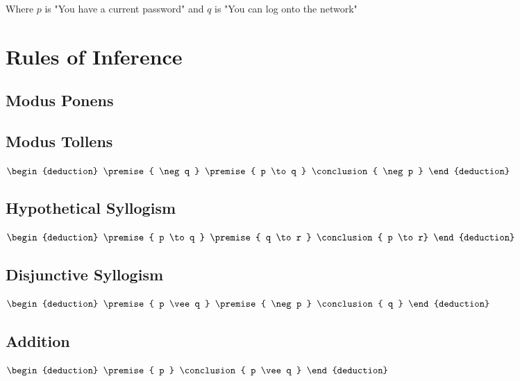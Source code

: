 \documentclass[12pt letter]{report}
\begin{document}
Where $p$ is "You have a current password" and $q$ is "You can log onto the network"



\section{Rules of Inference}

\subsection{Modus Ponens}

\begin{deduction}
\end{deduction}

\subsection{Modus Tollens}

\begin{math}
	\begin{deduction}
		\premise{ \neg q }
		\premise{ p \to q }
		\conclusion{ \neg p }
	\end{deduction}
\end{math}


\subsection{Hypothetical Syllogism}

\begin{math}
	\begin{deduction}
		\premise{ p \to q }
		\premise{ q \to r }
		\conclusion{ p \to  r}
	\end{deduction}
\end{math}


\subsection{Disjunctive Syllogism}
\begin{math}
	\begin{deduction}
		\premise{ p \vee q }
		\premise{ \neg  p }
		\conclusion{ q }
	\end{deduction}
\end{math}

\subsection{Addition}
\begin{math}
	\begin{deduction}
		\premise{ p }
		\conclusion{ p \vee  q }
	\end{deduction}
\end{math}
\end{document}
